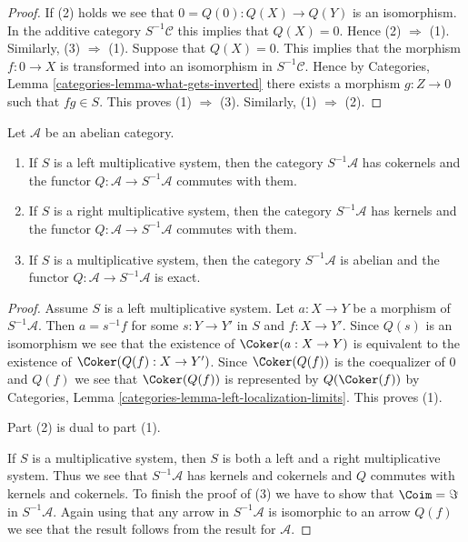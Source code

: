 \begin{proof}
If (2) holds we see that $0 = Q(0) : Q(X) \to Q(Y)$ is an isomorphism.
In the additive category $S^{-1}\mathcal{C}$ this implies that $Q(X) = 0$.
Hence (2) $\Rightarrow$ (1). Similarly, (3) $\Rightarrow$ (1).
Suppose that $Q(X) = 0$. This implies that the morphism
$f : 0 \to X$ is transformed into an isomorphism in $S^{-1}\mathcal{C}$.
Hence by
Categories, Lemma \ref{categories-lemma-what-gets-inverted}
there exists a morphism $g : Z \to 0$ such that $fg \in S$. This proves
(1) $\Rightarrow$ (3). Similarly, (1) $\Rightarrow$ (2).
\end{proof}

\begin{lemma}
\label{lemma-localization-abelian}
Let $\mathcal{A}$ be an abelian category.
\begin{enumerate}
\item If $S$ is a left multiplicative system, then
the category $S^{-1}\mathcal{A}$ has cokernels and the functor
$Q : \mathcal{A} \to S^{-1}\mathcal{A}$ commutes with them.
\item If $S$ is a right multiplicative system, then
the category $S^{-1}\mathcal{A}$ has kernels and the functor
$Q : \mathcal{A} \to S^{-1}\mathcal{A}$ commutes with them.
\item If $S$ is a multiplicative system, then the category
$S^{-1}\mathcal{A}$ is abelian and the functor
$Q : \mathcal{A} \to S^{-1}\mathcal{A}$ is exact.
\end{enumerate}
\end{lemma}

\begin{proof}
Assume $S$ is a left multiplicative system. Let $a : X \to Y$ be a morphism
of $S^{-1}\mathcal{A}$. Then $a = s^{-1}f$ for some $s : Y \to Y'$
in $S$ and $f : X \to Y'$. Since $Q(s)$ is an isomorphism we see that
the existence of $\Coker(a : X \to Y)$ is equivalent to the existence
of $\Coker(Q(f) : X \to Y')$. Since $\Coker(Q(f))$ is the
coequalizer of $0$ and $Q(f)$ we see that $\Coker(Q(f))$ is
represented by $Q(\Coker(f))$ by
Categories, Lemma \ref{categories-lemma-left-localization-limits}.
This proves (1).

\medskip\noindent
Part (2) is dual to part (1).

\medskip\noindent
If $S$ is a multiplicative system, then $S$ is both a left and a right
multiplicative system. Thus we see that $S^{-1}\mathcal{A}$ has
kernels and cokernels and $Q$ commutes with kernels and cokernels.
To finish the proof of (3) we have to show that $\Coim = \Im$ in
$S^{-1}\mathcal{A}$. Again using that any arrow in $S^{-1}\mathcal{A}$
is isomorphic to an arrow $Q(f)$ we see that the result follows
from the result for $\mathcal{A}$.
\end{proof}




